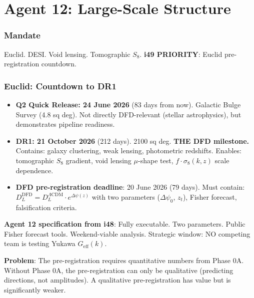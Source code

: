 \documentclass[11pt,a4paper]{article}
\begin{document}
\part{Agent 12: Large-Scale Structure}
\label{part:agent12}

\section{Mandate}

Euclid. DESI. Void lensing. Tomographic $S_8$. \textbf{i49 PRIORITY}: Euclid pre-registration countdown.

\section{Euclid: Countdown to DR1}

\begin{tcolorbox}[colback=blue!5!white, colframe=blue!60!black,
  title={Euclid Timeline: Critical Milestones}]

\begin{itemize}
\item \textbf{Q2 Quick Release: 24 June 2026} (83 days from now). Galactic Bulge Survey (4.8 sq deg). Not directly DFD-relevant (stellar astrophysics), but demonstrates pipeline readiness.
\item \textbf{DR1: 21 October 2026} (212 days). 2100 sq deg. \textbf{THE DFD milestone.} Contains: galaxy clustering, weak lensing, photometric redshifts. Enables: tomographic $S_8$ gradient, void lensing $\mu$-shape test, $f \cdot \sigma_8(k,z)$ scale dependence.
\item \textbf{DFD pre-registration deadline}: 20 June 2026 (79 days). Must contain: $D_L^{\text{DFD}} = D_L^{\Lambda\text{CDM}} \cdot e^{\Delta\psi(z)}$ with two parameters ($\Delta\psi_0$, $z_t$), Fisher forecast, falsification criteria.
\end{itemize}

\textbf{Agent 12 specification from i48}: Fully executable. Two parameters. Public Fisher forecast tools. Weekend-viable analysis. Strategic window: NO competing team is testing Yukawa $G_{\text{eff}}(k)$.

\textbf{Problem}: The pre-registration requires quantitative numbers from Phase 0A. Without Phase 0A, the pre-registration can only be qualitative (predicting directions, not amplitudes). A qualitative pre-registration has value but is significantly weaker.
\end{tcolorbox}
\end{document}

